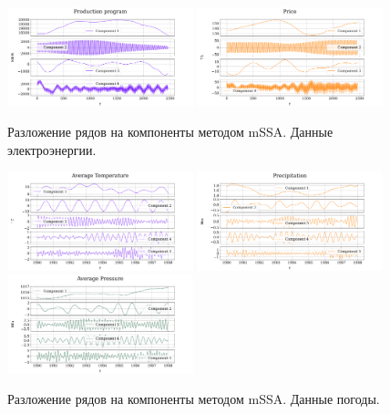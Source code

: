 	
	\begin{figure}[h!]
		\centering
		\includegraphics[width=0.48\textwidth, keepaspectratio]{../../experiments/electricity/mssa/figs/decomposition/manual/grouping_1/Production_program.png}
		\includegraphics[width=0.48\textwidth, keepaspectratio]{../../experiments/electricity/mssa/figs/decomposition/manual/grouping_1/Price.png}
		\caption{Разложение рядов на компоненты методом mSSA. Данные электроэнергии.}\label{fig:electr_decomp_mssa}
	\end{figure}
	
	\begin{figure}[h!]
		\centering
		\includegraphics[width=0.48\textwidth, keepaspectratio]{../../experiments/weather/mssa/figs/decomposition/manual/grouping_1/Average_Temperature.png}
		\includegraphics[width=0.48\textwidth, keepaspectratio]{../../experiments/weather/mssa/figs/decomposition/manual/grouping_1/Precipitation.png}
		\includegraphics[width=0.48\textwidth, keepaspectratio]{../../experiments/weather/mssa/figs/decomposition/manual/grouping_1/Average_Pressure.png}
		\caption{Разложение рядов на компоненты методом mSSA. Данные погоды.}\label{fig:weather_decomp_mssa}
	\end{figure}
		
		\clearpage
		\printbibliography
	
